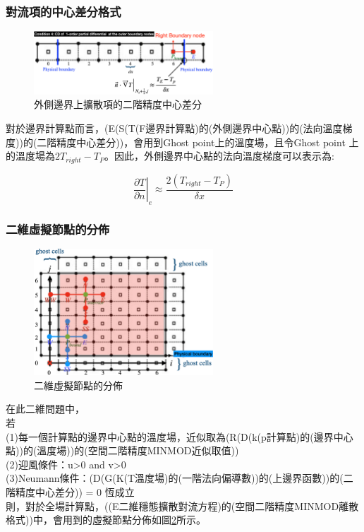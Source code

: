 \documentclass[12pt]{article}
\begin{document}
\subsubsection{對流項的中心差分格式}
\begin{figure}[H]
    \centering
    \includegraphics[width=0.6\textwidth]{37.png}
    \caption{\footnotesize 外側邊界上擴散項的二階精度中心差分}
    \label{fig:外側邊界上擴散項的二階精度中心差分}
\end{figure}
\noindent 對於邊界計算點而言，(E(S(T(F邊界計算點)的(外側邊界中心點))的(法向溫度梯度))的(二階精度中心差分))，會用到Ghost point上的溫度場，且令Ghost point 上的溫度場為$2T_{right} - T_{P}$。因此，外側邊界中心點的法向溫度梯度可以表示為:

\begin{equation}
    \left.\frac{\partial T}{\partial n}\right|_{e} \approx \frac{2(T_{right} - T_{P})}{\delta x}
\end{equation}
\subsubsection{二維虛擬節點的分佈}
\begin{figure}[H]
    \centering
    \includegraphics[width=0.6\textwidth]{32.png}
    \caption{\footnotesize 二維虛擬節點的分佈}
    \label{fig:二維虛擬節點的分佈}
\end{figure}
\noindent 在此二維問題中，\\
若\\[1.5ex]
(1)每一個計算點的邊界中心點的溫度場，近似取為(R(D(k(p計算點)的(邊界中心點))的(溫度場))的(空間二階精度MINMOD近似取值))\\[1.5ex]
(2)迎風條件：u>0 and v>0\\[1.5ex]
(3)Neumann條件：(D(G(K(T溫度場)的(一階法向偏導數))的(上邊界函數))的(二階精度中心差分)) = 0 恆成立\\[1.0ex]
則，對於全場計算點，((E二維穩態擴散對流方程)的(空間二階精度MINMOD離散格式))中，會用到的虛擬節點分佈如圖\ref{fig:二維虛擬節點的分佈}所示。
\end{document}
